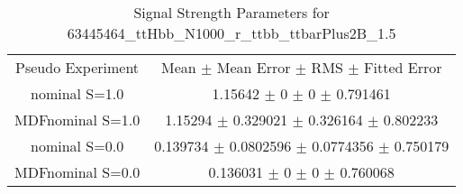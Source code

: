 \begin{table}
\centering
\caption{Signal Strength Parameters for 63445464\_ttHbb\_N1000\_r\_ttbb\_ttbarPlus2B\_1.5}
\begin{tabular}{cc}
\toprule
Pseudo Experiment & Mean $\pm$ Mean Error $\pm$ RMS $\pm$ Fitted Error\\
nominal S=1.0 & \num{1.15642} $\pm$ \num{0} $\pm$ \num{0} $\pm$ \num{0.791461}\\
MDFnominal S=1.0 & \num{1.15294} $\pm$ \num{0.329021} $\pm$ \num{0.326164} $\pm$ \num{0.802233}\\
nominal S=0.0 & \num{0.139734} $\pm$ \num{0.0802596} $\pm$ \num{0.0774356} $\pm$ \num{0.750179}\\
MDFnominal S=0.0 & \num{0.136031} $\pm$ \num{0} $\pm$ \num{0} $\pm$ \num{0.760068}\\
\bottomrule
\end{tabular}
\end{table}